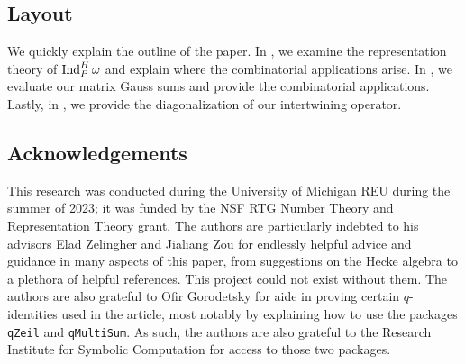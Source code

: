 \documentclass{amsart}
\begin{document}
    

\subsection{Layout}
We quickly explain the outline of the paper. In , we examine the representation theory of $\operatorname{Ind}_P^H\omega$ and explain where the combinatorial applications arise. In , we evaluate our matrix Gauss sums and provide the combinatorial applications. Lastly, in , we provide the diagonalization of our intertwining operator.

\subsection{Acknowledgements}
This research was conducted during the University of Michigan REU during the summer of 2023; it was funded by the NSF RTG Number Theory and Representation Theory grant. The authors are particularly indebted to his advisors Elad Zelingher and Jialiang Zou for endlessly helpful advice and guidance in many aspects of this paper, from suggestions on the Hecke algebra to a plethora of helpful references. This project could not exist without them. The authors are also grateful to Ofir Gorodetsky for aide in proving certain $q$-identities used in the article, most notably by explaining how to use the packages \texttt{qZeil} and \texttt{qMultiSum}. As such, the authors are also grateful to the Research Institute for Symbolic Computation for access to those two packages.
\end{document}

